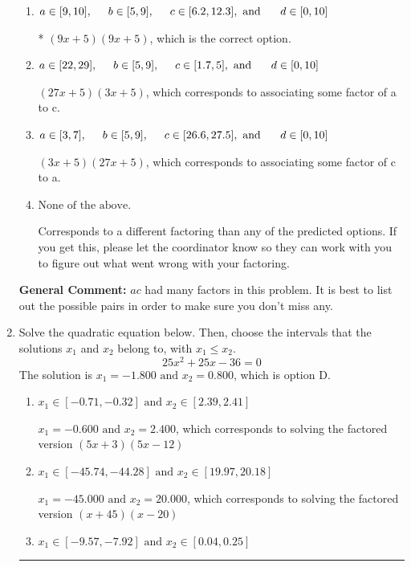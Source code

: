 \documentclass{extbook}[14pt]
\newcommand{\litem}[1]{\item #1

\rule{\textwidth}{0.4pt}}
\begin{document}
\begin{enumerate}
{\begin{enumerate}[label=\Alph*.]
 $(x + 45)(x + 45)$, which corresponds to factoring $x^{2} +90 x + 2025$.
\item \( a \in [9, 10], \hspace*{5mm} b \in [5, 9], \hspace*{5mm} c \in [6.2, 12.3], \text{ and } \hspace*{5mm} d \in [0, 10] \)

* $(9x + 5)(9x + 5)$, which is the correct option.
\item \( a \in [22, 29], \hspace*{5mm} b \in [5, 9], \hspace*{5mm} c \in [1.7, 5], \text{ and } \hspace*{5mm} d \in [0, 10] \)

 $(27x + 5)(3x + 5)$, which corresponds to associating some factor of a to c.
\item \( a \in [3, 7], \hspace*{5mm} b \in [5, 9], \hspace*{5mm} c \in [26.6, 27.5], \text{ and } \hspace*{5mm} d \in [0, 10] \)

 $(3x + 5)(27x + 5)$, which corresponds to associating some factor of c to a.
\item \( \text{None of the above.} \)

 Corresponds to a different factoring than any of the predicted options. If you get this, please let the coordinator know so they can work with you to figure out what went wrong with your factoring.
\end{enumerate}

\textbf{General Comment:} $ac$ had many factors in this problem. It is best to list out the possible pairs in order to make sure you don't miss any.
}
\litem{
Solve the quadratic equation below. Then, choose the intervals that the solutions $x_1$ and $x_2$ belong to, with $x_1 \leq x_2$.
\[ 25x^{2} +25 x -36 = 0 \]The solution is \( x_1 = -1.800 \text{ and } x_2 = 0.800 \), which is option D.\begin{enumerate}[label=\Alph*.]
\item \( x_1 \in [-0.71, -0.32] \text{ and } x_2 \in [2.39, 2.41] \)

$x_1 = -0.600 \text{ and } x_2 = 2.400$, which corresponds to solving the factored version $(5x + 3)(5x -12)$
\item \( x_1 \in [-45.74, -44.28] \text{ and } x_2 \in [19.97, 20.18] \)

$x_1 = -45.000 \text{ and } x_2 = 20.000$, which corresponds to solving the factored version $(x + 45)(x -20)$
\item \( x_1 \in [-9.57, -7.92] \text{ and } x_2 \in [0.04, 0.25] \)


\end{enumerate}}
\end{enumerate}
\end{document}
